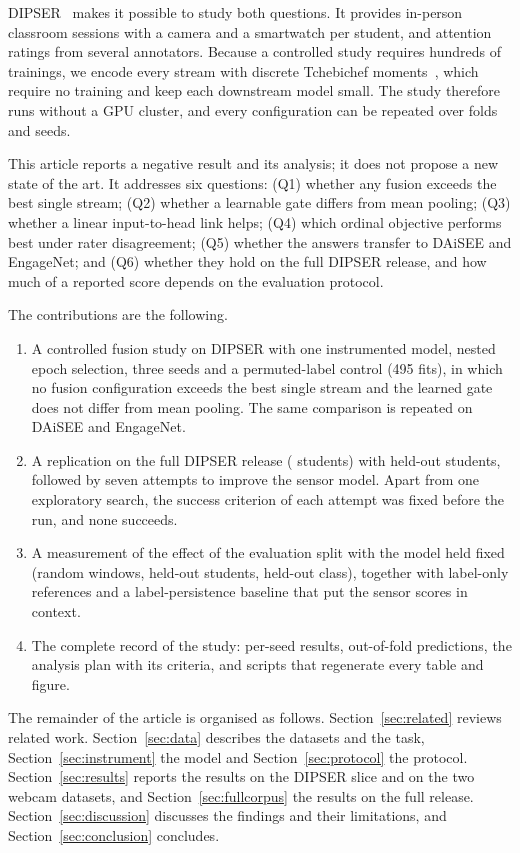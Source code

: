 DIPSER~\cite{marquezcarpintero2025dipser} makes it possible to study both questions. It provides in-person classroom sessions with a camera and a smartwatch per student, and attention ratings from several annotators. Because a controlled study requires hundreds of trainings, we encode every stream with discrete Tchebichef moments~\cite{mukundan2001tchebichef}, which require no training and keep each downstream model small. The study therefore runs without a GPU cluster, and every configuration can be repeated over folds and seeds.

This article reports a negative result and its analysis; it does not propose a new state of the art. It addresses six questions: (Q1) whether any fusion exceeds the best single stream; (Q2) whether a learnable gate differs from mean pooling; (Q3) whether a linear input-to-head link helps; (Q4) which ordinal objective performs best under rater disagreement; (Q5) whether the answers transfer to DAiSEE and EngageNet; and (Q6) whether they hold on the full DIPSER release, and how much of a reported score depends on the evaluation protocol.

The contributions are the following.
\begin{enumerate}
\item A controlled fusion study on DIPSER with one instrumented model, nested epoch selection, three seeds and a permuted-label control (495 fits), in which no fusion configuration exceeds the best single stream and the learned gate does not differ from mean pooling. The same comparison is repeated on DAiSEE and EngageNet.
\item A replication on the full DIPSER release (\fcPersons{} students) with held-out students, followed by seven attempts to improve the sensor model. Apart from one exploratory search, the success criterion of each attempt was fixed before the run, and none succeeds.
\item A measurement of the effect of the evaluation split with the model held fixed (random windows, held-out students, held-out class), together with label-only references and a label-persistence baseline that put the sensor scores in context.
\item The complete record of the study: per-seed results, out-of-fold predictions, the analysis plan with its criteria, and scripts that regenerate every table and figure.
\end{enumerate}

The remainder of the article is organised as follows. Section~\ref{sec:related} reviews related work. Section~\ref{sec:data} describes the datasets and the task, Section~\ref{sec:instrument} the model and Section~\ref{sec:protocol} the protocol. Section~\ref{sec:results} reports the results on the DIPSER slice and on the two webcam datasets, and Section~\ref{sec:fullcorpus} the results on the full release. Section~\ref{sec:discussion} discusses the findings and their limitations, and Section~\ref{sec:conclusion} concludes.
